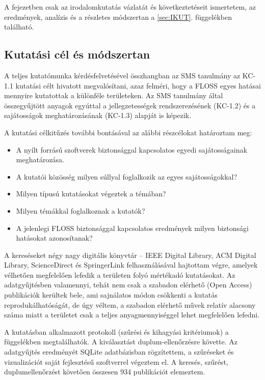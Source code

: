 \documentclass[12pt,magyar,a4paper,oneside]{scrreprt}
\providecommand{\tightlist}{%
  \setlength{\itemsep}{0pt}\setlength{\parskip}{0pt}}
\begin{document}
A fejezetben csak az irodalomkutatás vázlatát és következtetéseit
ismertetem, az eredmények, analízis és a részletes módszertan a
\ref{sec:IKUT}. függelékben található.

\hypertarget{kutatuxe1si-cuxe9l-uxe9s-muxf3dszertan}{%
\subsection{Kutatási cél és
módszertan}\label{kutatuxe1si-cuxe9l-uxe9s-muxf3dszertan}}

A teljes kutatómunka kérdésfelvetésével összhangban az SMS tanulmány az
KC-1.1 kutatási célt hivatott megvalósítani, azaz felméri, hogy a FLOSS
egyes hatásai mennyire kutatottak a különféle területeken. Az SMS
tanulmány által összegyűjtött anyagok egyúttal a jellegzetességek
rendszerezésének (KC-1.2) és a sajátosságok meghatározásának (KC-1.3)
alapját is képezik.

A kutatási célkitűzés további bontásával az alábbi részcélokat
határoztam meg:

\begin{itemize}
\tightlist
\item
  A nyílt forrású szoftverek biztonsággal kapcsolatos egyedi
  sajátosságainak meghatározása.
\item
  A kutatói közösség milyen súllyal foglalkozik az egyes
  sajátosságokkal?
\item
  Milyen típusú kutatásokat végeztek a témában?
\item
  Milyen témákkal foglalkoznak a kutatók?
\item
  A jelenlegi FLOSS biztonsággal kapcsolatos eredmények milyen
  biztonsági hatásokat azonosítanak?
\end{itemize}

A kereséseket négy nagy digitális könyvtár -- IEEE Digital Library, ACM
Digital Library, ScienceDirect és SpringerLink felhasználásával
hajtottam végre, amelyek vélhetően megfelelően lefedik a területen folyó
mértékadó kutatásokat. Az adatgyűjtésben valamennyi, tehát nem csak a
szabadon elérhető (Open Access) publikációk kerültek bele, ami
sajnálatos módon csökkenti a kutatás reprodukálhatóságát, de úgy véltem,
a szabadon elérhető művek relatív alacsony száma miatt a területet csak
a teljes anyagmennyiséggel lehet megfelelően lefedni.

A kutatásban alkalmazott protokoll (szűrési és kihagyási kritériumok) a
függelékben megtalálhatók. A kiválasztást duplum-ellenőrzésre követte.
Az adatgyűjtés eredményét SQLite adatbázisban rögzítettem, a szűréseket
és vizualizációt saját fejlesztésű szoftverrel végeztem el. A keresés,
szűrést, duplumellenőrzést követően összesen 934 publikációt elemeztem.
\end{document}
